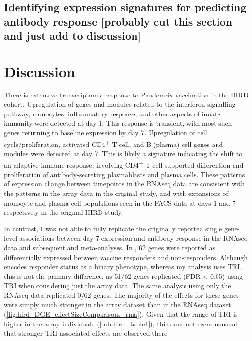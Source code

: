 \subsection{Identifying expression signatures for predicting antibody response [probably cut this section and just add to discussion]}

\section{Discussion}

There is extensive transcriptomic response to Pandemrix vaccination in the \gls{HIRD} cohort.
Upregulation of genes and modules related to the interferon signalling pathway, monocytes, inflammatory response, and other aspects of innate immunity were detected at day 1.
This response is transient, with most such genes returning to baseline expression by day 7.
Upregulation of cell cycle/proliferation, activated CD4\textsuperscript{+} T cell, and B (plasma) cell genes and modules were detected at day 7.
This is likely a signature indicating the shift to an adaptive immune response, involving CD4\textsuperscript{+} T cell-supported differention and proliferation of antibody-secreting plasmablasts and plasma cells\autocite{murphy2016JanewayImmunobiology}.
These patterns of expression change between timepoints in the \gls{RNAseq} data are consistent with the patterns in the array data in the original study\autocite{sobolev2016AdjuvantedInfluenzaH1N1Vaccination}, and with expansions of monocyte and plasma cell populations seen in the \gls{FACS} data at days 1 and 7 respectively in the original \gls{HIRD} study\autocite{sobolev2016AdjuvantedInfluenzaH1N1Vaccination}.

In contrast, I was not able to fully replicate the originally reported single gene-level associations between day 7 expression and antibody response in the \gls{RNAseq} data and subsequent and meta-analyses.
In \autocite{sobolev2016AdjuvantedInfluenzaH1N1Vaccination}, 62 genes were reported as differentially expressed between vaccine responders and non-responders.
Although \autocite{sobolev2016AdjuvantedInfluenzaH1N1Vaccination} encodes responder status as a binary phenotype, whereas my analysis uses \gls{TRI}, this is not the primary difference, as 51/62 genes replicated (\gls{FDR} < 0.05) using \gls{TRI} when considering just the array data.
The same analysis using only the \gls{RNAseq} data replicated 0/62 genes.
The majority of the effects for these genes were simply much stronger in the array dataset than in the RNAseq dataset (\autoref{fig:hird_DGE_effectSizeComparisons_rma}).
Given that the range of \gls{TRI} is higher in the array individuals (\autoref{tab:hird_table1}), this does not seem unusual that stronger \gls{TRI}-associated effects are observed there.

